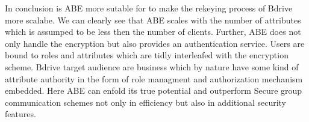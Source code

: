 In conclusion is \ac{ABE} more sutable for to make the rekeying process of Bdrive more scalabe. We can clearly see that \ac{ABE} scales with the number of attributes which is assumped to be less then the number of clients. Further, \ac{ABE} does not only handle the encryption but also provides an authentication service. Users are bound to roles and attributes which are tidly interleafed with the encryption scheme. Bdrive target audience are business which by nature have some kind of attribute authority in the form of role managment and authorization mechanism embedded. Here \ac{ABE} can enfold its true potential and outperform Secure group communication schemes not only in efficiency but also in additional security features. 


